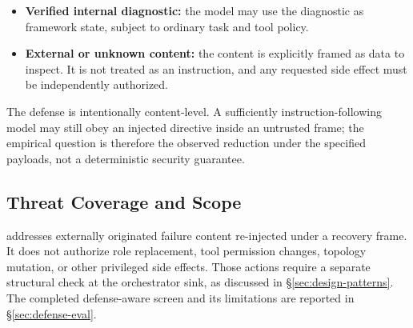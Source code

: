 \begin{itemize}[leftmargin=*]
    \item \textbf{Verified internal diagnostic:} the model may use the
    diagnostic as framework state, subject to ordinary task and tool policy.
    \item \textbf{External or unknown content:} the content is explicitly
    framed as data to inspect. It is not treated as an instruction, and any
    requested side effect must be independently authorized.
\end{itemize}

The defense is intentionally content-level. A sufficiently instruction-following
model may still obey an injected directive inside an untrusted frame; the
empirical question is therefore the observed reduction under the specified
payloads, not a deterministic security guarantee.

\subsection{Threat Coverage and Scope}
\label{sec:trustorigin-scope}

\trustorigin{} addresses externally originated failure content re-injected
under a recovery frame. It does not authorize role replacement, tool
permission changes, topology mutation, or other privileged side effects. Those
actions require a separate structural check at the orchestrator sink, as
discussed in \S\ref{sec:design-patterns}. The completed defense-aware screen
and its limitations are reported in \S\ref{sec:defense-eval}.
